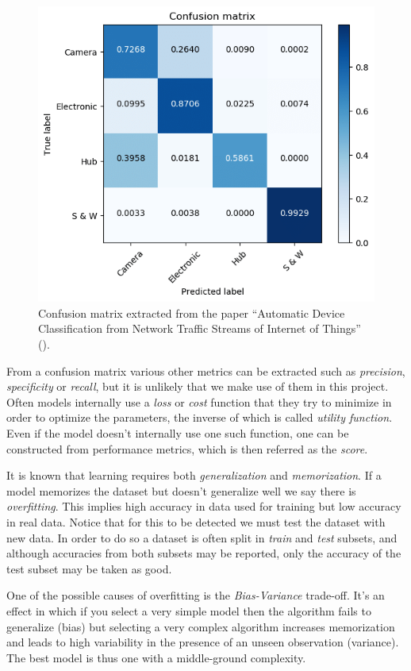 \begin{figure}[H]
    \centering
    \includegraphics[width=0.5\linewidth]{img/ch4/confusion.png}
    \caption{Confusion matrix extracted from the paper “Automatic Device Classification from Network Traffic Streams of Internet of Things” (\cite{bai_automatic_2018}).}
    \label{fig:ch4.confusion}
\end{figure}

From a confusion matrix various other metrics can be extracted such as \emph{precision}, \emph{specificity} or \emph{recall}, but it is unlikely that we make use of them in this project. Often models internally use a \emph{loss} or \emph{cost} function that they try to minimize in order to optimize the parameters, the inverse of which is called \emph{utility function}. Even if the model doesn't internally use one such function, one can be constructed from performance metrics, which is then referred as the \emph{score}. 

It is known that learning requires both \emph{generalization} and \emph{memorization}. If a model memorizes the dataset but doesn't generalize well we say there is \emph{overfitting}. This implies high accuracy in data used for training but low accuracy in real data. Notice that for this to be detected we must test the dataset with new data. In order to do so a dataset is often split in \emph{train} and \emph{test} subsets, and although accuracies from both subsets may be reported, only the accuracy of the test subset may be taken as good.

One of the possible causes of overfitting is the \emph{Bias-Variance} trade-off. It's an effect in which if you select a very simple model then the algorithm fails to generalize (bias) but selecting a very complex algorithm increases memorization and leads to high variability in the presence of an unseen observation (variance). The best model is thus one with a middle-ground complexity.


